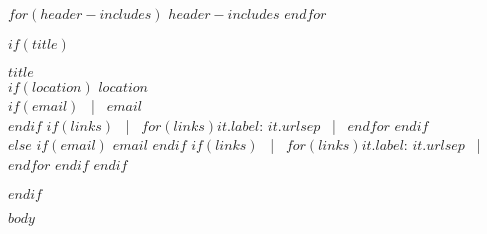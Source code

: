 \documentclass[11pt,a4paper]{article}
\begin{document}
$for(header-includes)$
$header-includes$
$endfor$

$if(title)$
\begin{center}
    {\Huge \textbf{\textcolor{mypurple}{$title$}}} \\[1mm]
    $if(location)$
        $location$ \\[1mm]
        $if(email)$
            \, | \, \href{mailto:$email$}{$email$} \\[1mm]
        $endif$
        $if(links)$
            \, | \, $for(links)$$it.label$: \href{$it.url$}{$it.url$}$sep$ \, | \, $endfor$
        $endif$ \\[2mm]
    $else$
        $if(email)$
            \href{mailto:$email$}{$email$}%
        $endif$%
        $if(links)$
            \, | \, $for(links)$$it.label$: \href{$it.url$}{$it.url$}$sep$ \, | \, $endfor$
        $endif$
    $endif$
\end{center}
$endif$

$body$
\end{document}
